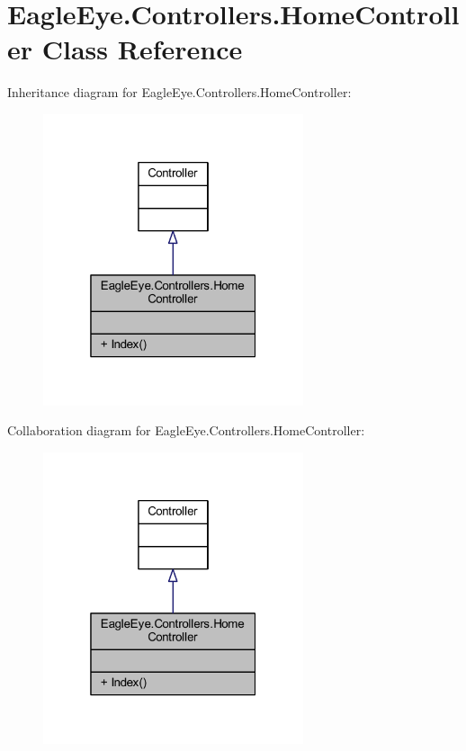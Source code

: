 \hypertarget{class_eagle_eye_1_1_controllers_1_1_home_controller}{}\section{Eagle\+Eye.\+Controllers.\+Home\+Controller Class Reference}
\label{class_eagle_eye_1_1_controllers_1_1_home_controller}


 




Inheritance diagram for Eagle\+Eye.\+Controllers.\+Home\+Controller\+:
\nopagebreak
\begin{figure}[H]
\begin{center}
\leavevmode
\includegraphics[width=217pt]{class_eagle_eye_1_1_controllers_1_1_home_controller__inherit__graph}
\end{center}
\end{figure}


Collaboration diagram for Eagle\+Eye.\+Controllers.\+Home\+Controller\+:
\nopagebreak
\begin{figure}[H]
\begin{center}
\leavevmode
\includegraphics[width=217pt]{class_eagle_eye_1_1_controllers_1_1_home_controller__coll__graph}
\end{center}
\end{figure}
